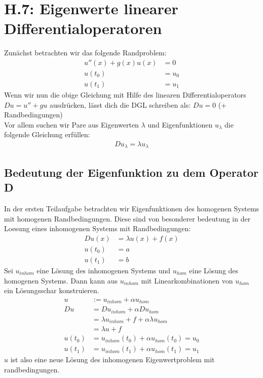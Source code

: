 \documentclass[ngerman]{scrartcl}
\begin{document}
\thispagestyle{fancy}

\section{H.7: Eigenwerte linearer Differentialoperatoren}
	Zunächst betrachten wir das folgende Randproblem:
	\begin{align*}
		u''(x) + g(x) u(x) &= 0\\
		u(t_0) &= u_0\\
		u(t_1) &= u_1
	\end{align*}
	Wenn wir nun die obige Gleichung mit Hilfe des linearen Differentialoperators $Du=u''+gu$ ausdrücken, lässt dich die DGL schreiben als: $Du=0$ (+ Randbedingungen) \\
	Vor allem suchen wir Pare aus Eigenwerten $\lambda$ und Eigenfunktionen $u_\lambda$ die folgende Gleichung erfüllen:
	\begin{align}
		Du_\lambda=\lambda u_\lambda
	\end{align}
\subsection{Bedeutung der Eigenfunktion zu dem Operator D}
	In der ersten Teilaufgabe betrachten wir Eigenfunktionen des homogenen Systems mit homogenen Randbedingungen. 
	Diese sind von besonderer bedeutung in der Loesung eines inhomogenen Systems mit Randbedingungen:
	\begin{align}
		D u(x) &= \lambda u(x) + f(x)\\
		u (t_0) &= a \nonumber\\
		u(t_1) &= b
	\end{align}
	Sei $u_{inhom}$ eine Lösung des inhomogenen Systems und $u_{hom}$ eine Lösung des homogenen Systems.
	Dann kann aus $u_{inhom}$ mit Linearkombinationen von $u_{hom}$ ein Lösungsschar konstruieren.
	\begin{align*}
		u &:=u_{inhom}+\alpha u_{hom}\\
		Du &= Du_{inhom}+\alpha Du_{hom}\\
		&= \lambda u_{inhom} + f+\alpha \lambda u_{hom}\\
		&= \lambda u + f\\
		u(t_0)&=u_{inhom}(t_0)+\alpha u_{hom}(t_0)=u_0\\
		u(t_1)&=u_{inhom}(t_1)+\alpha u_{hom}(t_1)=u_1
	\end{align*}
	$u$ ist also eine neue Lösung des inhomogenen Eigenwertproblem mit randbedingungen.
\end{document}
